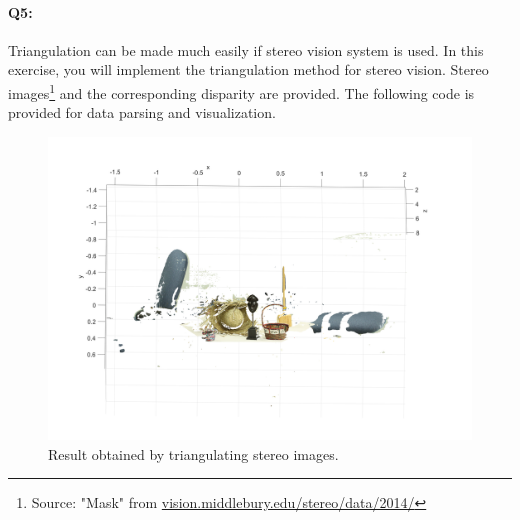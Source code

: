 \documentclass[a4paper]{article}
\begin{document}
\paragraph{Q5:}
Triangulation can be made much easily if stereo vision system is used. In this exercise, you will implement the triangulation method for stereo vision. Stereo images\footnote{Source: "Mask" from \url{vision.middlebury.edu/stereo/data/2014/}} and the corresponding disparity are provided. The following code is provided for data parsing and visualization.


\begin{figure}[!b]
\centering
\includegraphics[scale=0.5]{figures/stereo.png}
\caption{Result obtained by triangulating stereo images.}
\end{figure}
 
 

\end{document}
